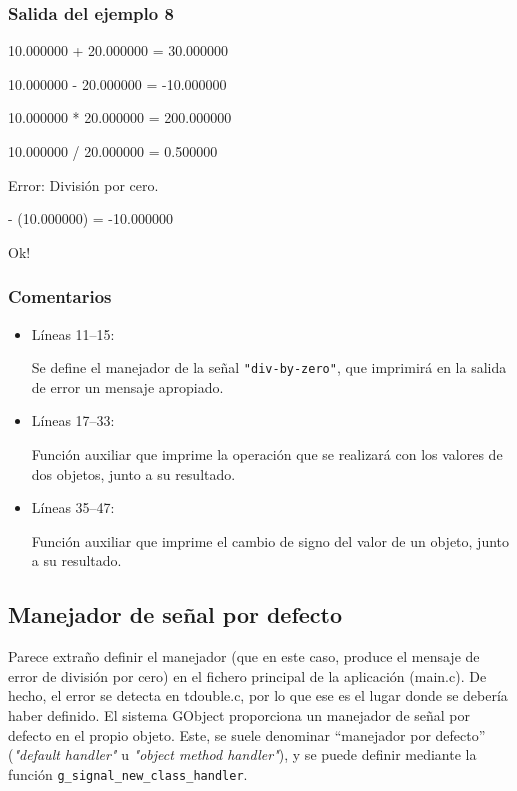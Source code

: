\subsubsection{Salida del ejemplo 8}
10.000000 + 20.000000 = 30.000000\par
10.000000 - 20.000000 = -10.000000\par
10.000000 * 20.000000 = 200.000000\par
10.000000 / 20.000000 = 0.500000\par
\vspace{1ex}
Error: División por cero.\par
\vspace{1ex}
- (10.000000) = -10.000000\par
Ok!\par

\subsubsection{Comentarios}
\begin{itemize}
\item Líneas 11--15:\par
  Se define el manejador de la señal \texttt{"div-by-zero"}, que imprimirá en la salida de error un
  mensaje apropiado.
\item Líneas 17--33:\par
  Función auxiliar que imprime la operación que se realizará con los valores de dos objetos, junto
  a su resultado.
\item Líneas 35--47:\par
  Función auxiliar que imprime el cambio de signo del valor de un objeto, junto a su resultado.
\end{itemize}

\subsection{Manejador de señal por defecto}
Parece extraño definir el manejador (que en este caso, produce el mensaje de error de división por
cero) en el fichero principal de la aplicación (\textsf{main.c}). De hecho, el error se detecta en \textsf{tdouble.c},
por lo que ese es el lugar donde se debería haber definido. El sistema \textsf{GObject} proporciona
un manejador de señal por defecto en el propio objeto. Este, se suele denominar ``manejador por defecto''
(\emph{"default handler"} u \emph{"object method handler"}), y se puede definir mediante la función \texttt{g\_signal\_new\_class\_handler}.

